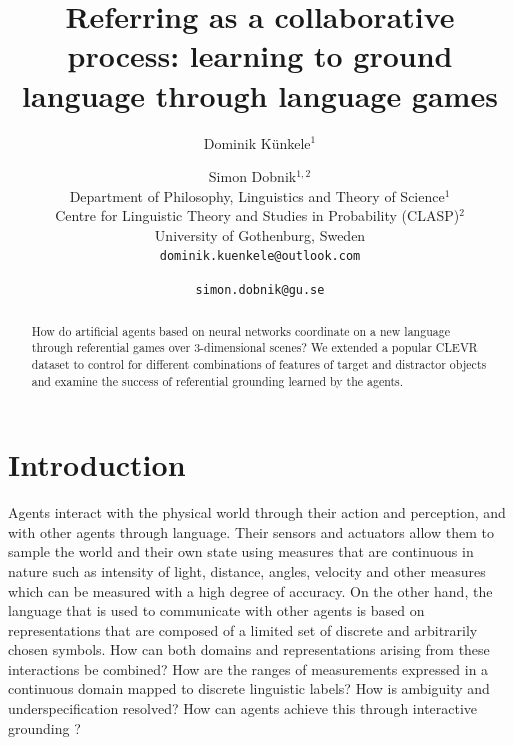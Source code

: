 \documentclass[11pt]{article}
\title{Referring as a collaborative process: learning to ground \\ language through language games} %
\author{Dominik Künkele$^{1}$ \and Simon Dobnik$^{1,2}$ \\
        Department of Philosophy, Linguistics and Theory of Science$^{1}$ \\ 
        Centre for Linguistic Theory and Studies in Probability (CLASP)$^{2}$ \\
        University of Gothenburg, Sweden \\
        \texttt{dominik.kuenkele@outlook.com} \and \texttt{simon.dobnik@gu.se}}
\begin{document}
\maketitle
\begin{abstract}
  How do artificial agents based on neural networks coordinate on a new language through referential games over 3-dimensional scenes?
  We extended a popular CLEVR dataset to control for different combinations of features of target and distractor objects and examine the success of referential grounding learned by the agents.
\end{abstract}

\section{Introduction}

Agents interact with the physical world through their action and perception, and with other agents through language.
Their sensors and actuators %
allow them to sample the world and their own state using measures that are continuous in nature such as intensity of light, distance, angles, velocity and other measures which can be measured with a high degree of accuracy.
On the other hand, the language that is used to communicate with other agents is based on representations that are composed of a limited set of discrete and arbitrarily chosen symbols.
How can both domains and representations arising from these interactions be combined? How are the ranges of measurements expressed in a continuous domain mapped to discrete linguistic labels?
How is ambiguity and underspecification resolved?
How can agents achieve this through interactive grounding \citep{Regier:1996,Roy:2005,Cooper:2023aa}?


\end{document}
